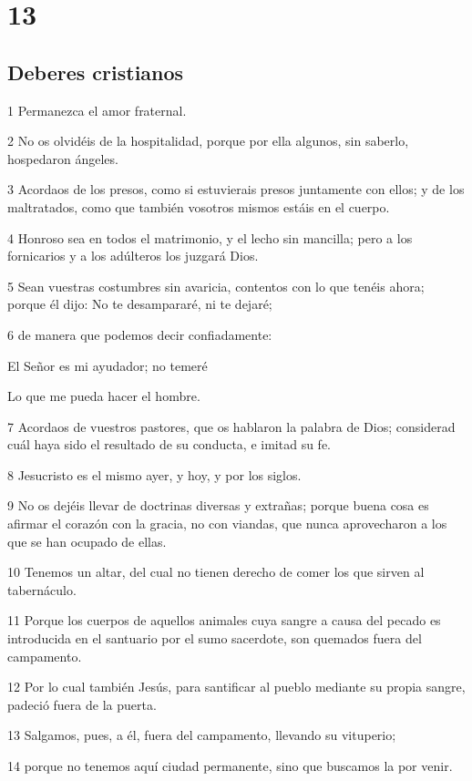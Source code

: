 \chapter{13}

\section*{Deberes cristianos}

\par 1 Permanezca el amor fraternal.
\par 2 No os olvidéis de la hospitalidad, porque por ella algunos, sin saberlo, hospedaron ángeles.
\par 3 Acordaos de los presos, como si estuvierais presos juntamente con ellos; y de los maltratados, como que también vosotros mismos estáis en el cuerpo.
\par 4 Honroso sea en todos el matrimonio, y el lecho sin mancilla; pero a los fornicarios y a los adúlteros los juzgará Dios.
\par 5 Sean vuestras costumbres sin avaricia, contentos con lo que tenéis ahora; porque él dijo: No te desampararé, ni te dejaré;
\par 6 de manera que podemos decir confiadamente:
\par El Señor es mi ayudador; no temeré
\par Lo que me pueda hacer el hombre.
\par 7 Acordaos de vuestros pastores, que os hablaron la palabra de Dios; considerad cuál haya sido el resultado de su conducta, e imitad su fe.
\par 8 Jesucristo es el mismo ayer, y hoy, y por los siglos.
\par 9 No os dejéis llevar de doctrinas diversas y extrañas; porque buena cosa es afirmar el corazón con la gracia, no con viandas, que nunca aprovecharon a los que se han ocupado de ellas.
\par 10 Tenemos un altar, del cual no tienen derecho de comer los que sirven al tabernáculo.
\par 11 Porque los cuerpos de aquellos animales cuya sangre a causa del pecado es introducida en el santuario por el sumo sacerdote, son quemados fuera del campamento.
\par 12 Por lo cual también Jesús, para santificar al pueblo mediante su propia sangre, padeció fuera de la puerta.
\par 13 Salgamos, pues, a él, fuera del campamento, llevando su vituperio;
\par 14 porque no tenemos aquí ciudad permanente, sino que buscamos la por venir.
